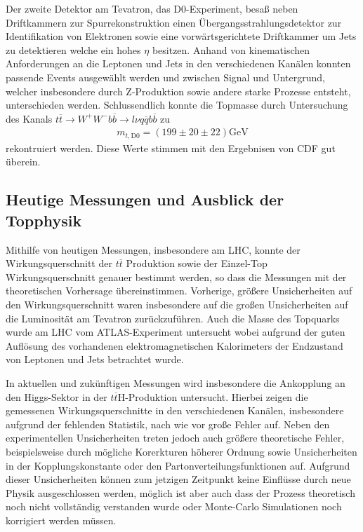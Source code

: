 Der zweite Detektor am Tevatron, das D0-Experiment, besaß neben Driftkammern zur Spurrekonstruktion einen Übergangsstrahlungsdetektor zur Identifikation von Elektronen sowie eine vorwärtsgerichtete Driftkammer um Jets zu detektieren welche ein hohes $\eta$ besitzen.
Anhand von kinematischen Anforderungen an die Leptonen und Jets in den verschiedenen Kanälen konnten passende Events ausgewählt werden und zwischen Signal und Untergrund, welcher insbesondere durch Z-Produktion sowie andere starke Prozesse entsteht, unterschieden werden.
Schlussendlich konnte die Topmasse durch Untersuchung des Kanals $t\overline{t} \rightarrow W^+ W^- b \overline{b} \rightarrow l \nu q \overline{q} b \overline{b}$ zu
\begin{align*}
	m_{t, \text{D0}} = \left( 199 \pm 20 \pm 22 \right)\si{\giga\electronvolt}
\end{align*}
rekontruiert werden.
Diese Werte stimmen mit den Ergebnisen von CDF gut überein.

\subsection{Heutige Messungen und Ausblick der Topphysik}
\label{sec:higgs}

Mithilfe von heutigen Messungen, insbesondere am LHC, konnte der Wirkungsquerschnitt der $t\overline{t}$ Produktion sowie der Einzel-Top Wirkungsquerschnitt genauer bestimmt werden, so dass die Messungen mit der theoretischen Vorhersage übereinstimmen.
Vorherige, größere Unsicherheiten auf den Wirkungsquerschnitt waren insbesondere auf die großen Unsicherheiten auf die Luminosität am Tevatron zurückzuführen.
Auch die Masse des Topquarks wurde am LHC vom ATLAS-Experiment untersucht wobei aufgrund der guten Auflösung des vorhandenen elektromagnetischen Kalorimeters der Endzustand von Leptonen und Jets betrachtet wurde.

In aktuellen und zukünftigen Messungen wird insbesondere die Ankopplung an den Higgs-Sektor in der $t \overline{t} \text{H}$-Produktion untersucht.
Hierbei zeigen die gemessenen Wirkungsquerschnitte in den verschiedenen Kanälen, insbesondere aufgrund der fehlenden Statistik, nach wie vor große Fehler auf.
Neben den experimentellen Unsicherheiten treten jedoch auch größere theoretische Fehler, beispielsweise durch mögliche Korerkturen höherer Ordnung sowie Unsicherheiten in der Kopplungskonstante oder den Partonverteilungsfunktionen auf.
Aufgrund dieser Unsicherheiten können zum jetzigen Zeitpunkt keine Einflüsse durch neue Physik ausgeschlossen werden, möglich ist aber auch dass der Prozess theoretisch noch nicht vollständig verstanden wurde oder Monte-Carlo Simulationen noch korrigiert werden müssen.